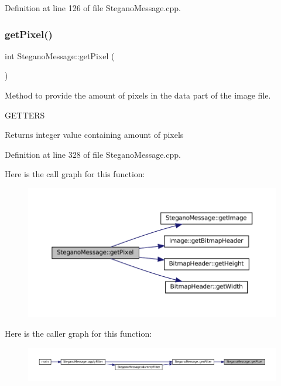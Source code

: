 Definition at line 126 of file Stegano\+Message.\+cpp.

\mbox{\label{classSteganoMessage_a12231d3596b90fe4c6d67bd694b27d07}} 
\subsubsection{\texorpdfstring{getPixel()}{getPixel()}}
{\footnotesize\ttfamily int Stegano\+Message\+::get\+Pixel (\begin{DoxyParamCaption}{ }\end{DoxyParamCaption})\hspace{0.3cm}{\ttfamily [private]}}



Method to provide the amount of pixels in the data part of the image file. 

G\+E\+T\+T\+E\+RS\begin{DoxyReturn}{Returns}
integer value containing amount of pixels 
\end{DoxyReturn}


Definition at line 328 of file Stegano\+Message.\+cpp.

Here is the call graph for this function\+:\nopagebreak
\begin{figure}[H]
\begin{center}
\leavevmode
\includegraphics[width=350pt]{classSteganoMessage_a12231d3596b90fe4c6d67bd694b27d07_cgraph}
\end{center}
\end{figure}
Here is the caller graph for this function\+:\nopagebreak
\begin{figure}[H]
\begin{center}
\leavevmode
\includegraphics[width=350pt]{classSteganoMessage_a12231d3596b90fe4c6d67bd694b27d07_icgraph}
\end{center}
\end{figure}
\mbox{\label{classSteganoMessage_aeb4d2b69498c148508e2ca70194679cc}} 

